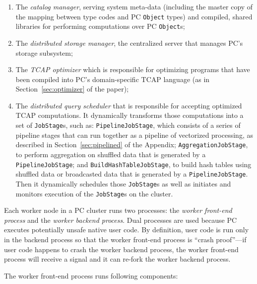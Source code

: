 \begin{enumerate}
\item The \emph{catalog manager}, serving system meta-data (including the master copy of
the mapping between type codes and PC \texttt{Object} types) and compiled, shared libraries
for performing computations over PC \texttt{Object}s;
\item The \emph{distributed storage manager}, 
the centralized server that manages PC's storage subsystem; 
\item The \emph{TCAP optimizer} which is responsible for optimizing
  programs that have been compiled into PC's domain-specific TCAP
  language (as in 
Section~\ref{sec:optimizer} of the paper);
\item The \emph{distributed query scheduler} that is responsible for accepting optimized TCAP computations.
It dynamically transforms those computations into a set of \texttt{JobStage}s,
such as:
\texttt{PipelineJobStage}, which consists of a series of pipeline
stages that can run together as a pipeline of vectorized processing, as
described in Section~\ref{sec:pipelined} of the Appendix;
\texttt{AggregationJobStage}, to perform aggregation on shuffled data that is
generated by a \texttt{PipelineJobStage}; and \texttt{BuildHashTableJobStage}, to build hash
tables using shuffled data or broadcasted data that is generated by a
\texttt{PipelineJobStage}. Then it
dynamically schedules those \texttt{JobStage}s as well as initiates and
monitors execution of the \texttt{JobStage}s on the cluster.
\end{enumerate}

\noindent 
Each worker node in a PC cluster runs two processes: the \emph{worker front-end process} and the \emph{worker backend process}.
Dual processes are used because PC executes potentially unsafe native user code.  By definition, user code is run only in the backend process so that the
worker front-end process is ``crash proof''---if            
user code happens to crash the worker backend process, the worker front-end process will receive a signal and it can re-fork the worker
backend process.

The worker front-end process runs following components:

